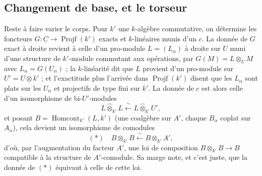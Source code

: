 \documentclass[11pt,a4paper]{article}
\begin{document}
\subsection*{Changement de base, et le torseur}

Reste à faire varier le corps. Pour $k'$ une $k$-algèbre commutative, on
détermine les foncteurs $G \colon \underline{C} \to \operatorname{Projf}(k')$
exacts et $k$-linéaires munis d'un $c$. La donnée de $G$ exact à droite revient
à celle d'un pro-module $L = (L_{\alpha})$ à droite sur $U$ muni d'une
structure de $k'$-module commutant aux opérations, par $G(M) = L \otimes_{U} M$
avec $L_{\alpha} = G(U_{\alpha})$ ; la $k$-linéarité dit que $L$ provient d'un
pro-module sur $U' = U \otimes k'$ ; et l'exactitude plus l'arrivée dans
$\operatorname{Projf}(k')$ disent que les $L_{\alpha}$ sont plats sur les
$U_{\alpha}$ et projectifs de type fini sur $k'$. La donnée de $c$ est alors
celle d'un isomorphisme de bi-$U'$-modules
\[
L \mathbin{\widehat{\otimes}}_{k'} L \xleftarrow{\ \sim\ }
L \mathbin{\widehat{\otimes}}_{k'} U' ,
\]
et posant $B = \operatorname{Homcont}_{k'}(L, k')$ (une coalgèbre sur $A'$,
chaque $B_{\alpha}$ coplat sur $A_{\alpha}$), cela devient un isomorphisme de
comodules
\[
(*)\quad B \otimes_{k'} B \xleftarrow{\ \sim\ } B \otimes_{k'} A' ,
\]
d'où, par l'augmentation du facteur $A'$, une loi de composition
$B \otimes_{k'} B \to B$ compatible à la structure de $A'$-comodule. Sa marge
note, et c'est juste, que la donnée de $(*)$ équivaut à celle de cette loi.
\end{document}
